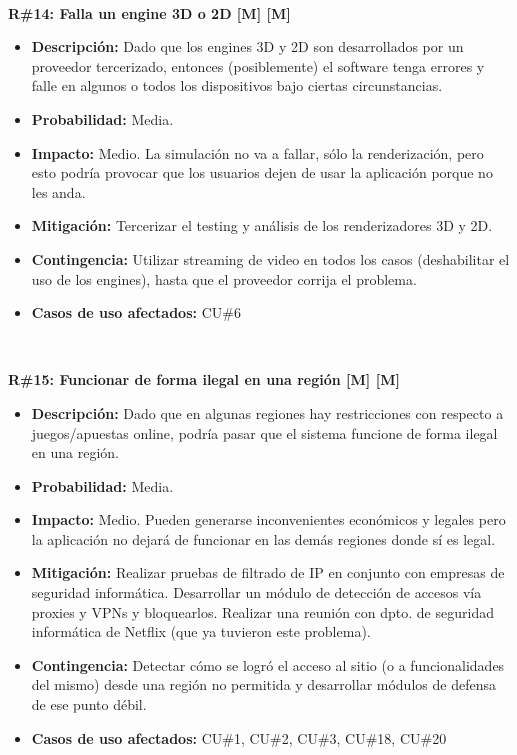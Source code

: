 ~

\noindent\textbf{R\#14: Falla un engine 3D o 2D [M] [M] } 
\begin{itemize}
	\item{\textbf{Descripción:} Dado que los engines 3D y 2D son desarrollados por un proveedor tercerizado, entonces (posiblemente) el software tenga errores y falle en algunos o todos los dispositivos bajo ciertas circunstancias.}
	\item{\textbf{Probabilidad:} Media.}
	\item{\textbf{Impacto:} Medio. La simulación no va a fallar, sólo la renderización, pero esto podría provocar que los usuarios dejen de usar la aplicación porque no les anda.}
	\item{\textbf{Mitigación:} Tercerizar el testing y análisis de los renderizadores 3D y 2D.}
	\item{\textbf{Contingencia:} Utilizar streaming de video en todos los casos (deshabilitar el uso de los engines), hasta que el proveedor corrija el problema.}
	\item{\textbf{Casos de uso afectados:} CU\#6}
\end{itemize}

~

\noindent\textbf{R\#15: Funcionar de forma ilegal en una región [M] [M] } 
\begin{itemize}
	\item{\textbf{Descripción:} Dado que en algunas regiones hay restricciones con respecto a juegos/apuestas online, podría pasar que el sistema funcione de forma ilegal en una región.}
	\item{\textbf{Probabilidad:} Media.}
	\item{\textbf{Impacto:} Medio. Pueden generarse inconvenientes económicos y legales pero la aplicación no dejará de funcionar en las demás regiones donde sí es legal.}
	\item{\textbf{Mitigación:} Realizar pruebas de filtrado de IP en conjunto con empresas de seguridad informática. Desarrollar un módulo de detección de accesos vía proxies y VPNs y bloquearlos. Realizar una reunión con dpto. de seguridad informática de Netflix (que ya tuvieron este problema).}
	\item{\textbf{Contingencia:} Detectar cómo se logró el acceso al sitio (o a funcionalidades del mismo) desde una región no permitida y desarrollar módulos de defensa de ese punto débil.}
	\item{\textbf{Casos de uso afectados:} CU\#1, CU\#2, CU\#3, CU\#18, CU\#20}
\end{itemize}

